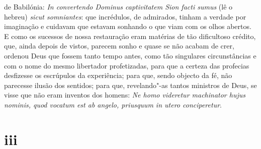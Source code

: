 de Babilónia: \emph{In convertendo Dominus captivitatem Sion facti
sumus} (lê o hebreu) \emph{sicut somniantes}: que incrédulos, de
admirados, tinham a verdade por imaginação e cuidavam que estavam
sonhando o que viam com os olhos abertos. E como os sucessos de nossa
restauração eram matérias de tão dificultoso crédito, que, ainda depois
de vistos, parecem sonho e quase se não acabam de crer, ordenou Deus que
fossem tanto tempo antes, como tão singulares circunstâncias e com o
nome do mesmo libertador profetizadas, para que a certeza das profecias
desfizesse os escrúpulos da experiência; para que, sendo objecto da fé,
não parecesse ilusão dos sentidos; para que, revelando"-as tantos
ministros de Deus, se visse que não eram inventos dos homens: \emph{Ne
homo videretur machinator hujus nominis, quod vocatum est ab angelo,
priusquum in utero conciperetur}.

\section{iii}

